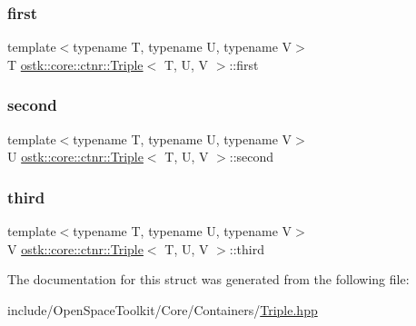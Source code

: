 \subsubsection{\texorpdfstring{first}{first}}
{\footnotesize\ttfamily template$<$typename T, typename U, typename V$>$ \\
T \hyperlink{structostk_1_1core_1_1ctnr_1_1_triple}{ostk\+::core\+::ctnr\+::\+Triple}$<$ T, U, V $>$\+::first}

\mbox{\label{structostk_1_1core_1_1ctnr_1_1_triple_a20851607908231eb1bca53693655a31c}} 
\subsubsection{\texorpdfstring{second}{second}}
{\footnotesize\ttfamily template$<$typename T, typename U, typename V$>$ \\
U \hyperlink{structostk_1_1core_1_1ctnr_1_1_triple}{ostk\+::core\+::ctnr\+::\+Triple}$<$ T, U, V $>$\+::second}

\mbox{\label{structostk_1_1core_1_1ctnr_1_1_triple_a47c1a85baaeeff5ca5e08cf93047c2d2}} 
\subsubsection{\texorpdfstring{third}{third}}
{\footnotesize\ttfamily template$<$typename T, typename U, typename V$>$ \\
V \hyperlink{structostk_1_1core_1_1ctnr_1_1_triple}{ostk\+::core\+::ctnr\+::\+Triple}$<$ T, U, V $>$\+::third}



The documentation for this struct was generated from the following file\+:\begin{DoxyCompactItemize}
\item 
include/\+Open\+Space\+Toolkit/\+Core/\+Containers/\hyperlink{_triple_8hpp}{Triple.\+hpp}\end{DoxyCompactItemize}
